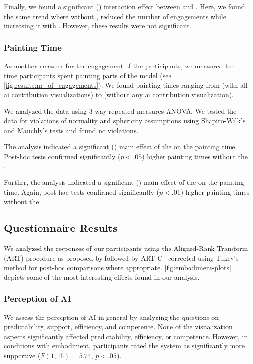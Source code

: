 Finally, we found a significant () interaction effect between \ivHigh{} and \ivEmb{}. Here, we found the same trend where without \ivHigh{}, \ivEmb{} reduced the number of engagements while increasing it with \ivHigh{}. However, these results were not significant.

\subsubsection{Painting Time}

As another measure for the engagement of the participants, we measured the time participants spent painting parts of the model (see \autoref{fig:results:nr_of_engagements}). We found painting times ranging from  (with all ai contribution visualizations) to  (without any ai contribution visualization).

We analyzed the data using 3-way repeated measures ANOVA. We tested the data for violations of normality and sphericity assumptions using Shapiro-Wilk's and Mauchly's tests and found no violations.

The analysis indicated a significant () main effect of the \ivInc{} on the painting time. Post-hoc tests confirmed significantly ($p<.05$) higher painting times without the \ivInc{}.

Further, the analysis indicated a significant () main effect of the \ivEmb{} on the painting time. Again, post-hoc tests confirmed significantly ($p<.01$) higher painting times without the \ivEmb{}.

\subsection{Questionnaire Results}
We analyzed the responses of our participants using the Aligned-Rank Transform (ART) procedure as proposed by \citet{wobbrock_aligned_2011} followed by ART-C~\cite{elkin2021} corrected using Tukey's method for post-hoc comparisons where appropriate. 
\autoref{fig:embodiment-plots} depicts some of the most interesting effects found in our analysis. 



\subsubsection{Perception of AI}
We assess the perception of AI in general by analyzing the questions on predictability, support, efficiency, and competence.
None of the visualization aspects significantly affected predictability, efficiency, or competence. However, in conditions with embodiment, participants rated the system as significantly more supportive ($F(1, 15)=5.74$, $p<.05$).

